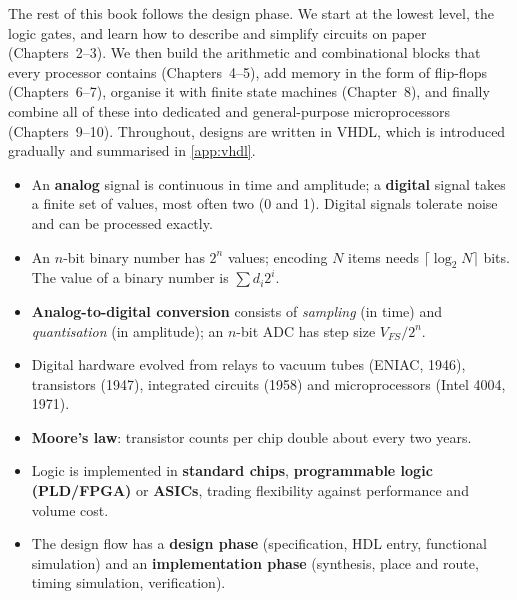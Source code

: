 
The rest of this book follows the design phase. We start at the lowest level, the logic gates, and learn how to describe and simplify circuits on paper (Chapters~2--3). We then build the arithmetic and combinational blocks that every processor contains (Chapters~4--5), add memory in the form of flip-flops (Chapters~6--7), organise it with finite state machines (Chapter~8), and finally combine all of these into dedicated and general-purpose microprocessors (Chapters~9--10). Throughout, designs are written in VHDL, which is introduced gradually and summarised in \cref{app:vhdl}.

\begin{chaptersummary}
\begin{itemize}
  \item An \textbf{analog} signal is continuous in time and amplitude; a \textbf{digital} signal takes a finite set of values, most often two (0 and 1). Digital signals tolerate noise and can be processed exactly.
  \item An $n$-bit binary number has $2^n$ values; encoding $N$ items needs $\lceil\log_2 N\rceil$ bits. The value of a binary number is $\sum d_i 2^i$.
  \item \textbf{Analog-to-digital conversion} consists of \emph{sampling} (in time) and \emph{quantisation} (in amplitude); an $n$-bit ADC has step size $V_{FS}/2^n$.
  \item Digital hardware evolved from relays to vacuum tubes (ENIAC, 1946), transistors (1947), integrated circuits (1958) and microprocessors (Intel 4004, 1971).
  \item \textbf{Moore's law}: transistor counts per chip double about every two years.
  \item Logic is implemented in \textbf{standard chips}, \textbf{programmable logic (PLD/FPGA)} or \textbf{ASICs}, trading flexibility against performance and volume cost.
  \item The design flow has a \textbf{design phase} (specification, HDL entry, functional simulation) and an \textbf{implementation phase} (synthesis, place and route, timing simulation, verification).
\end{itemize}
\end{chaptersummary}

